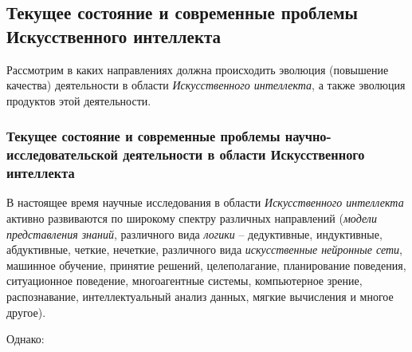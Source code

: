 \subsection{Текущее состояние и современные проблемы Искусственного интеллекта}

Рассмотрим в каких направлениях должна происходить эволюция (повышение качества) деятельности в области \textit{Искусственного интеллекта}, а также эволюция продуктов этой деятельности.

\subsubsection{Текущее состояние и современные проблемы научно-исследовательской деятельности в области Искусственного интеллекта}

В настоящее время научные исследования в области \textit{Искусственного интеллекта} активно развиваются по широкому спектру различных направлений (\textit{модели представления знаний}, различного вида \textit{логики} -- дедуктивные, индуктивные, абдуктивные, четкие, нечеткие, различного вида \textit{искусственные нейронные сети}, машинное обучение, принятие решений, целеполагание, планирование поведения, ситуационное поведение, многоагентные системы, компьютерное зрение, распознавание, интеллектуальный анализ данных, мягкие вычисления и многое другое).

Однако:

